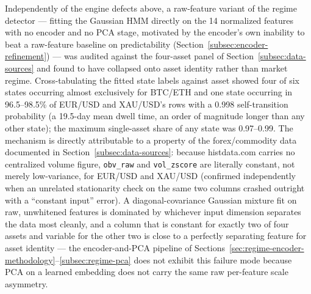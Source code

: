 Independently of the engine defects above, a raw-feature variant of the regime detector --- fitting the Gaussian HMM directly on the 14 normalized features with no encoder and no PCA stage, motivated by the encoder's own inability to beat a raw-feature baseline on predictability (Section~\ref{subsec:encoder-refinement}) --- was audited against the four-asset panel of Section~\ref{subsec:data-sources} and found to have collapsed onto asset identity rather than market regime. Cross-tabulating the fitted state labels against asset showed four of six states occurring almost exclusively for BTC/ETH and one state occurring in 96.5--98.5\% of EUR/USD and XAU/USD's rows with a 0.998 self-transition probability (a 19.5-day mean dwell time, an order of magnitude longer than any other state); the maximum single-asset share of any state was 0.97--0.99. The mechanism is directly attributable to a property of the forex/commodity data documented in Section~\ref{subsec:data-sources}: because histdata.com carries no centralized volume figure, \texttt{obv\_raw} and \texttt{vol\_zscore} are literally constant, not merely low-variance, for EUR/USD and XAU/USD (confirmed independently when an unrelated stationarity check on the same two columns crashed outright with a ``constant input'' error). A diagonal-covariance Gaussian mixture fit on raw, unwhitened features is dominated by whichever input dimension separates the data most cleanly, and a column that is constant for exactly two of four assets and variable for the other two is close to a perfectly separating feature for asset identity --- the encoder-and-PCA pipeline of Sections~\ref{sec:regime-encoder-methodology}--\ref{subsec:regime-pca} does not exhibit this failure mode because PCA on a learned embedding does not carry the same raw per-feature scale asymmetry.

